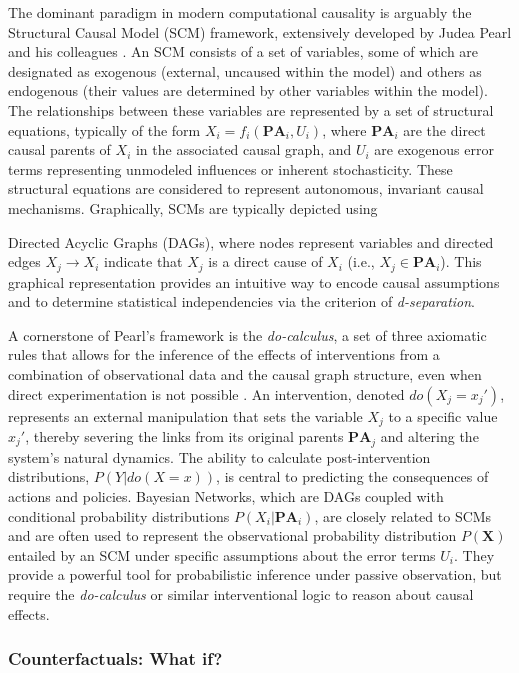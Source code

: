 The dominant paradigm in modern computational causality is arguably the Structural Causal Model (SCM) framework, extensively developed by Judea Pearl and his colleagues \cite{Pearl2009Causality}. An SCM consists of a set of variables, some of which are designated as exogenous (external, uncaused within the model) and others as endogenous (their values are determined by other variables within the model). The relationships between these variables are represented by a set of structural equations, typically of the form $X_i = f_i(\mathbf{PA}_i, U_i)$, where \(\mathbf{PA}_i\) are the direct causal parents of $X_i$ in the associated causal graph, and $U_i$ are exogenous error terms representing unmodeled influences or inherent stochasticity. These structural equations are considered to represent autonomous, invariant causal mechanisms. Graphically, SCMs are typically depicted using {Directed Acyclic Graphs (DAGs), where nodes represent variables and directed edges $X_j \to X_i$ indicate that $X_j$ is a direct cause of $X_i$ (i.e., $X_j \in \mathbf{PA}_i$). This graphical representation provides an intuitive way to encode causal assumptions and to determine statistical independencies via the criterion of \textit{d-separation}.

A cornerstone of Pearl's framework is the \textit{do-calculus}, a set of three axiomatic rules that allows for the inference of the effects of interventions from a combination of observational data and the causal graph structure, even when direct experimentation is not possible \cite{Pearl2009Causality}. An intervention, denoted $do(X_j=x_j')$, represents an external manipulation that sets the variable $X_j$ to a specific value $x_j'$, thereby severing the links from its original parents $\mathbf{PA}_j$ and altering the system's natural dynamics. The ability to calculate post-intervention distributions, $P(Y | do(X=x))$, is central to predicting the consequences of actions and policies. Bayesian Networks, which are DAGs coupled with conditional probability distributions $P(X_i | \mathbf{PA}_i)$, are closely related to SCMs and are often used to represent the observational probability distribution $P(\mathbf{X})$ entailed by an SCM under specific assumptions about the error terms $U_i$. They provide a powerful tool for probabilistic inference under passive observation, but require the \textit{do-calculus} or similar interventional logic to reason about causal effects.

\newpage

\subsubsection{Counterfactuals: What if?}
\label{subsec:counterfactuals}

}
